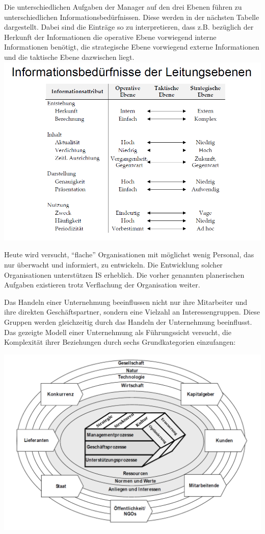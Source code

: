 \documentclass[]{article}
\begin{document}
Die unterschiedlichen Aufgaben der Manager auf den drei Ebenen führen zu
unterschiedlichen Informationsbedürfnissen. Diese werden in der nächsten
Tabelle dargestellt. Dabei sind die Einträge so zu interpretieren, dass
z.B. bezüglich der Herkunft der Informationen die operative Ebene
vorwiegend interne Informationen benötigt, die strategische Ebene
vorwiegend externe Informationen und die taktische Ebene dazwischen
liegt. \includegraphics{img/infobedarf.png}

Heute wird versucht, ``flache'' Organisationen mit möglichst wenig
Personal, das nur überwacht und informiert, zu entwickeln. Die
Entwicklung solcher Organisationen unterstützen IS erheblich. Die vorher
genannten planerischen Aufgaben existieren trotz Verflachung der
Organisation weiter.

Das Handeln einer Unternehmung beeinflussen nicht nur ihre Mitarbeiter
und ihre direkten Geschäftspartner, sondern eine Vielzahl an
Interessengruppen. Diese Gruppen werden gleichzeitig durch das Handeln
der Unternehmung beeinflusst. Das gezeigte Modell einer Unternehmung als
Führungssicht versucht, die Komplexität ihrer Beziehungen durch sechs
Grundkategorien einzufangen:

\includegraphics{img/manamodell.png}
\end{document}
